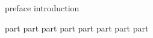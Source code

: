 \documentclass{claynote}
\begin{document}
\begin{void}
{

    \begin{pre}
        {preface}
        {introduction}
    \end{pre}

    \begin{body}
        {part}
        {part}
        {part}
        {part}
        {part}
        {part}
        {part}
        {part}
    \end{body}
}
\end{void}
\end{document}
